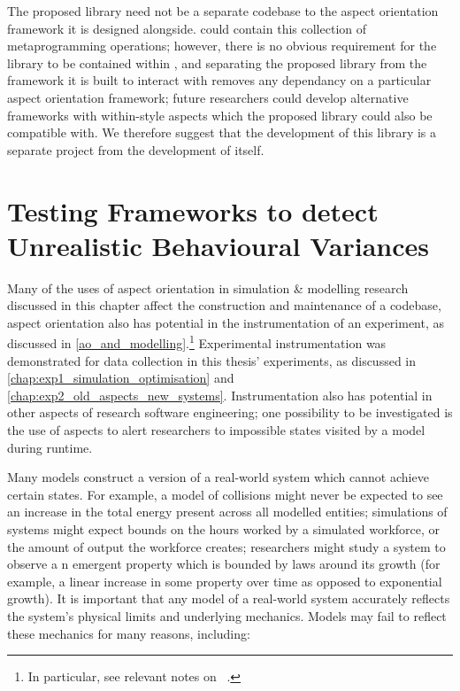 The proposed library need not be a separate codebase to the aspect orientation
framework it is designed alongside. \pdsf{} could contain this collection of
metaprogramming operations; however, there is no obvious requirement for
the library to be contained within \pdsf{}, and separating the proposed library
from the framework it is built to interact with removes any dependancy on a
particular aspect orientation framework; future researchers could develop
alternative frameworks with within-style aspects which the proposed library
could also be compatible with. We therefore suggest that the development of this
library is a separate project from the development of \pdsf{}
itself.



\section{Testing Frameworks to detect Unrealistic Behavioural
Variances}\label{sciunits_for_unrealistic_states}

Many of the uses of aspect orientation in simulation \& modelling research
discussed in this chapter affect the construction and maintenance of a codebase,
aspect orientation also has potential in the instrumentation of an
experiment, as discussed in \cref{ao_and_modelling}.\footnote{In particular,  
see relevant notes on ~\cite{gulyas1999use}.}
Experimental instrumentation was demonstrated for data collection in this
thesis' experiments, as discussed in \cref{chap:exp1_simulation_optimisation}
and \cref{chap:exp2_old_aspects_new_systems}. Instrumentation also
has potential in other aspects of research software engineering; one possibility
to be investigated is the use of aspects to alert researchers to impossible
states visited by a model during runtime.

Many models construct a version of a real-world system which cannot achieve
certain states. For example, a model of collisions might never be expected to
see an increase in the total energy present across all modelled entities;
simulations of \sociotechnical systems might expect bounds on the hours worked
by a simulated workforce, or the amount of output the workforce creates;
researchers might study a system to observe a n emergent property which is
bounded by laws around its growth (for example, a linear increase in some
property over time as opposed to exponential growth). It is important that any
model of a real-world system accurately reflects the system's physical limits
and underlying mechanics. Models may fail to reflect these mechanics for many
reasons, including:

